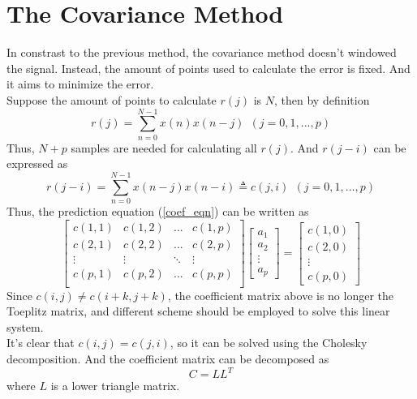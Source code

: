 \documentclass[preprint,12pt]{elsarticle}
\begin{document}
\section{The Covariance Method}
In constrast to the previous method, the covariance method doesn't windowed the signal. Instead, the amount of points used to calculate the error is fixed. And it aims to minimize the error.\\
Suppose the amount of points to calculate $r(j)$ is $N$, then by definition
\begin{equation}
	r(j) = \sum_{n=0}^{N-1}x(n)x(n-j) \ \ (j = 0, 1, ... , p)
\end{equation}
Thus, $N+p$ samples are needed for calculating all $r(j)$. And $r(j-i)$ can be expressed as 
\begin{equation}
	r(j-i) = \sum_{n=0}^{N-1} x(n-j)x(n-i) \triangleq c(j, i) \ \ (j = 0, 1, ... , p) 
\end{equation}
Thus, the prediction equation (\ref{coef_eqn}) can be written as
\begin{equation}
	\begin{bmatrix}
		c(1, 1) & c(1, 2) & ... & c(1, p)\\
		c(2, 1) & c(2, 2) & ... & c(2, p)\\
		\vdots  & \vdots  & \ddots & \vdots\\
		c(p, 1) & c(p, 2) & ... & c(p, p)\\
	\end{bmatrix}
	\begin{bmatrix}
		a_1 \\ a_2 \\ \vdots \\ a_p
	\end{bmatrix}
	=
	\begin{bmatrix}
		c(1, 0) \\ c(2, 0) \\ \vdots \\ c(p, 0)
	\end{bmatrix}
\end{equation}
Since $c(i, j) \neq c(i+k, j+k)$, the coefficient matrix above is no longer the Toeplitz matrix, and different scheme should be employed to solve this linear system.\\
It's clear that $c(i, j) = c(j, i)$, so it can be solved using the Cholesky decomposition. And the coefficient matrix can be decomposed as
\begin{equation}
	C = L L^T
\end{equation}
where $L$ is a lower triangle matrix.
\end{document}
